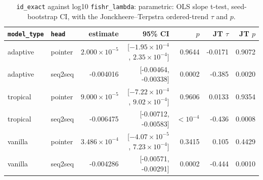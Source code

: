 \documentclass[10pt]{article}
\begin{document}
{\small
\begin{longtable}{llrrrrr}
\caption{\texttt{id\_exact} against log10 \texttt{fishr\_lambda}: parametric: OLS slope t-test, seed-bootstrap CI, with the Jonckheere--Terpstra ordered-trend $\tau$ and $p$.}\label{tab:trend-id_exact}\\
\toprule
\texttt{model\_type} & \texttt{head} & estimate & 95\% CI & $p$ & JT $\tau$ & JT $p$\\
\midrule
\endhead
adaptive & pointer & $2.000\times10^{-5}$ & [$-1.95\times10^{-4}$, $2.35\times10^{-4}$] & 0.9644 & -0.0171 & 0.9072\\
adaptive & seq2seq & -0.004016 & [-0.00464, -0.00338] & 0.0002 & -0.385 & 0.0020\\
tropical & pointer & $9.000\times10^{-5}$ & [$-7.22\times10^{-4}$, $9.02\times10^{-4}$] & 0.9606 & 0.0133 & 0.9354\\
tropical & seq2seq & -0.006475 & [-0.00712, -0.00583] & $<10^{-4}$ & -0.436 & 0.0008\\
vanilla & pointer & $3.486\times10^{-4}$ & [$-4.07\times10^{-5}$, $7.23\times10^{-4}$] & 0.3415 & 0.105 & 0.4429\\
vanilla & seq2seq & -0.004286 & [-0.00571, -0.00291] & 0.0002 & -0.444 & 0.0010\\
\bottomrule
\end{longtable}
}
\end{document}
